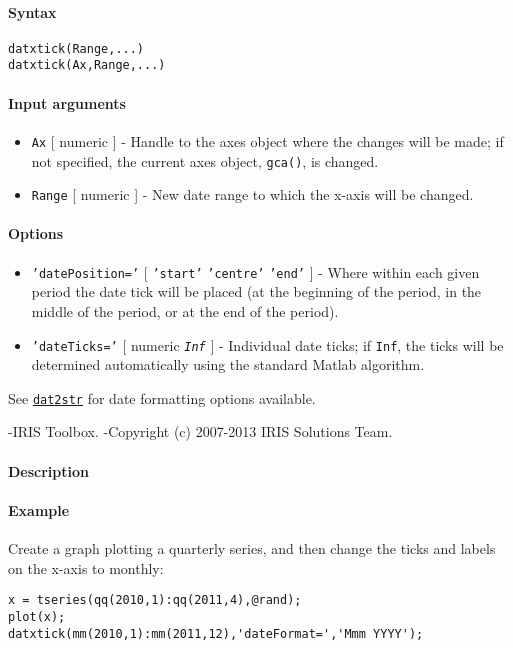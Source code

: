 


	\paragraph{Syntax}\label{syntax}

\begin{verbatim}
datxtick(Range,...)
datxtick(Ax,Range,...)
\end{verbatim}

\paragraph{Input arguments}\label{input-arguments}

\begin{itemize}
\item
  \texttt{Ax} {[} numeric {]} - Handle to the axes object where the
  changes will be made; if not specified, the current axes object,
  \texttt{gca()}, is changed.
\item
  \texttt{Range} {[} numeric {]} - New date range to which the x-axis
  will be changed.
\end{itemize}

\paragraph{Options}\label{options}

\begin{itemize}
\item
  \texttt{'datePosition='} {[} \texttt{'start'} \textbar{}
  \texttt{'centre'} \textbar{} \texttt{'end'} {]} - Where within each
  given period the date tick will be placed (at the beginning of the
  period, in the middle of the period, or at the end of the period).
\item
  \texttt{'dateTicks='} {[} numeric \textbar{} \emph{\texttt{Inf}} {]} -
  Individual date ticks; if \texttt{Inf}, the ticks will be determined
  automatically using the standard Matlab algorithm.
\end{itemize}

See \href{dates/dat2str}{\texttt{dat2str}} for date formatting options
available.

-IRIS Toolbox. -Copyright (c) 2007-2013 IRIS Solutions Team.

\paragraph{Description}\label{description}

\paragraph{Example}\label{example}

Create a graph plotting a quarterly series, and then change the ticks
and labels on the x-axis to monthly:

\begin{verbatim}
x = tseries(qq(2010,1):qq(2011,4),@rand);
plot(x);
datxtick(mm(2010,1):mm(2011,12),'dateFormat=','Mmm YYYY');
\end{verbatim}


